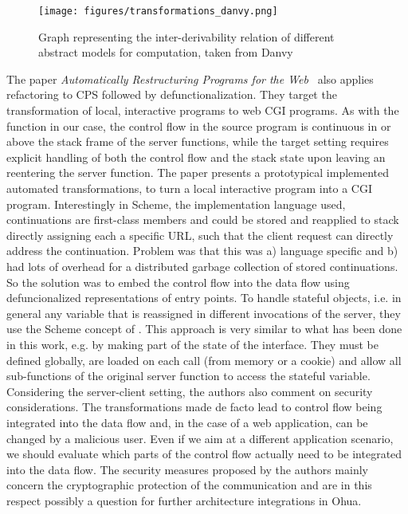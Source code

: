 \begin{figure}[H]
\centering
   \texttt{[image: figures/transformations\_danvy.png]}
\caption{Graph representing the inter-derivability relation of different abstract models for computation, taken from Danvy~\cite{danvy2008defunctionalized}}
\label{fig:transformationsDanvy}
\end{figure}

The paper \emph{Automatically Restructuring Programs for the Web}~\cite{graunke2001automatically} also applies refactoring to CPS followed by defunctionalization. They target the transformation of local, interactive programs to web CGI programs. As with the  function in our case, the control flow in the source program is continuous in or above the stack frame of the server functions, while the target setting requires explicit handling of both the control flow and the stack state upon leaving an reentering the server function. The paper presents a 
 prototypical implemented automated transformations, to turn a local interactive program into a CGI program. Interestingly in Scheme, the implementation language used, continuations are first-class members and could be stored and reapplied to stack directly assigning each a specific URL, such that the client request can directly address the continuation. Problem was that this was a) language specific and b) had lots of overhead for a distributed garbage collection of stored continuations. So the solution was to embed the control flow into the data flow using defuncionalized representations of entry points. To handle stateful objects, i.e. in general any variable that is reassigned in different invocations of the server, they use the Scheme concept of . This approach is very similar to what has been done in this work, e.g. by making part of the state of the interface. They must be defined globally, are loaded on each call (from memory or a cookie) and allow all sub-functions of the original server function to access the stateful variable. Considering the server-client setting, the authors also comment on security considerations. The transformations made de facto lead to control flow being integrated into the data flow and, in the case of a web application, can be changed by a malicious user. Even if we aim at a different application scenario, we should evaluate which parts of the control flow actually need to be integrated into the data flow. The security measures proposed by the authors mainly concern the cryptographic protection of the communication and are in this respect possibly a question for further architecture integrations in Ohua. \\

